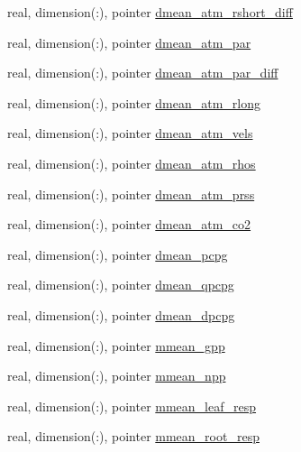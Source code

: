 \begin{DoxyCompactItemize}
\item 
real, dimension(\+:), pointer \hyperlink{structed__state__vars_1_1edtype_afa45de12daebd40eb5704097961af575}{dmean\+\_\+atm\+\_\+rshort\+\_\+diff}
\item 
real, dimension(\+:), pointer \hyperlink{structed__state__vars_1_1edtype_aaeded96b95ed3c4e97bf615e1a0f8747}{dmean\+\_\+atm\+\_\+par}
\item 
real, dimension(\+:), pointer \hyperlink{structed__state__vars_1_1edtype_a85c44643732f11603443a0af8de18c3f}{dmean\+\_\+atm\+\_\+par\+\_\+diff}
\item 
real, dimension(\+:), pointer \hyperlink{structed__state__vars_1_1edtype_ae07f756755f5423ca17793d29dcaa60b}{dmean\+\_\+atm\+\_\+rlong}
\item 
real, dimension(\+:), pointer \hyperlink{structed__state__vars_1_1edtype_a3877f247e267248a431bbc86f3b89ef5}{dmean\+\_\+atm\+\_\+vels}
\item 
real, dimension(\+:), pointer \hyperlink{structed__state__vars_1_1edtype_a1992cdb710dcfcf3d227922203f5de51}{dmean\+\_\+atm\+\_\+rhos}
\item 
real, dimension(\+:), pointer \hyperlink{structed__state__vars_1_1edtype_a6c1a939521f2e9ec6659f02b453ab66b}{dmean\+\_\+atm\+\_\+prss}
\item 
real, dimension(\+:), pointer \hyperlink{structed__state__vars_1_1edtype_a9be586f5715b94c043e290e43e613226}{dmean\+\_\+atm\+\_\+co2}
\item 
real, dimension(\+:), pointer \hyperlink{structed__state__vars_1_1edtype_a1e8e0079ceb5a35a527de24657e0163f}{dmean\+\_\+pcpg}
\item 
real, dimension(\+:), pointer \hyperlink{structed__state__vars_1_1edtype_a2b4d3dd876dee39e82ad9911956041ca}{dmean\+\_\+qpcpg}
\item 
real, dimension(\+:), pointer \hyperlink{structed__state__vars_1_1edtype_a8adccd6a9098821311916ff0d985b8b8}{dmean\+\_\+dpcpg}
\item 
real, dimension(\+:), pointer \hyperlink{structed__state__vars_1_1edtype_a25836fb842845a83f3e91065df24e2aa}{mmean\+\_\+gpp}
\item 
real, dimension(\+:), pointer \hyperlink{structed__state__vars_1_1edtype_aa59fcc62e51f932f53ddf46dcb2e2aa6}{mmean\+\_\+npp}
\item 
real, dimension(\+:), pointer \hyperlink{structed__state__vars_1_1edtype_a7b0babb7ca77c75c4500cb1071aff36d}{mmean\+\_\+leaf\+\_\+resp}
\item 
real, dimension(\+:), pointer \hyperlink{structed__state__vars_1_1edtype_af6f6ff7d131b9d4306c0941d0a85e999}{mmean\+\_\+root\+\_\+resp}

\end{DoxyCompactItemize}
